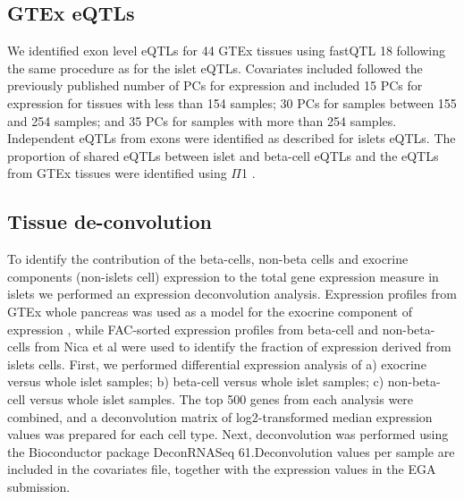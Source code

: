 \subsection{GTEx eQTLs}
We identified exon level eQTLs for 44 GTEx tissues using fastQTL 18 following the same procedure as for the islet eQTLs. Covariates included followed the previously published number of PCs for expression \cite{gtexconsortiumGeneticEffectsGene2017} and included 15 PCs for expression for tissues with less than 154 samples; 30 PCs for samples between 155 and 254 samples; and 35 PCs for samples with more than 254 samples. Independent eQTLs from exons were identified as described for islets eQTLs. The proportion of shared eQTLs between islet and beta-cell eQTLs and the eQTLs from GTEx tissues were identified using $\Pi$1 \cite{storeyDirectApproachFalse2002}.

\subsection{Tissue de-convolution}
To identify the contribution of the beta-cells, non-beta cells and exocrine components (non-islets cell) expression to the total gene expression measure in islets we performed an expression deconvolution analysis. Expression profiles from GTEx whole pancreas was used as a model for the exocrine component of expression \cite{gtexconsortiumGeneticEffectsGene2017}, while FAC-sorted expression profiles from beta-cell and non-beta-cells from Nica et al \cite{nicaCelltypeAllelicGenetic2013} were used to identify the fraction of expression derived from islets cells. First, we performed differential expression analysis of a) exocrine versus whole islet samples; b) beta-cell versus whole islet samples; c) non-beta-cell versus whole islet samples. The top 500 genes from each analysis were combined, and a deconvolution matrix of log2-transformed median expression values was prepared for each cell type. Next, deconvolution was performed using the Bioconductor package DeconRNASeq 61.Deconvolution values per sample are included in the covariates file, together with the expression values in the EGA submission. 

